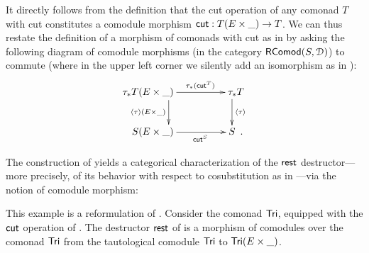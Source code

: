 \documentclass[a4paper,USenglish]{lipics}
\begin{document}
\begin{Long}

It directly follows from the definition that the cut operation of any comonad $T$ with cut 
constitutes a comodule morphism $\mathsf{cut} : T(E\times \_) \to T$.
We can thus restate the definition of a morphism of comonads with cut as in  by asking the following diagram 
of comodule morphisms (in the category $\mathsf{RComod}(S,\mathcal{D})$) to commute
(where in the upper left corner we silently add an isomorphism as in ):
 \[ \begin{xy}
       \xymatrix{  **[l] \tau_*T(E\times \_ )  \ar[r]^{\tau_*(\cut^T)} \ar[d]_{\induced{\tau}(E\times \_)}  &  **[r] \tau_*T \ar[d]^{\induced{\tau}} \\
                   **[l]  S (E\times \_ ) \ar[r]_{\cut^S}  &  **[r] S  \enspace .
        }
      \end{xy}
   \]

\end{Long}



\begin{Long}
The construction of  yields a categorical characterization of the $\mathsf{rest}$ destructor---%
more precisely, of its behavior with respect to cosubstitution as in ---via the notion of comodule morphism:


\begin{ex}\label{ex:tail_comodule_alternative}
This example is a reformulation of .
 Consider the comonad $\mathsf{Tri}$, equipped with the $\mathsf{cut}$ operation of .
 The destructor $\mathsf{rest}$ of  is a morphism of comodules over the comonad $\mathsf{Tri}$ 
  from the tautological comodule  $\mathsf{Tri}$ to $\mathsf{Tri}(E\times \_)$.
  
\end{ex}
\end{Long}
\end{document}
